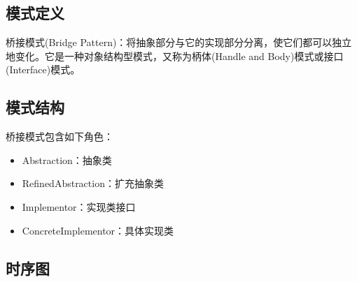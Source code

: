 \documentclass[letterpaper,10pt,english]{sphinxmanual}
\begin{document}
\subsection{模式定义}
\label{\detokenize{structural_patterns/bridge:id4}}
\sphinxAtStartPar
桥接模式(Bridge Pattern)：将抽象部分与它的实现部分分离，使它们都可以独立地变化。它是一种对象结构型模式，又称为柄体(Handle and Body)模式或接口(Interface)模式。


\subsection{模式结构}
\label{\detokenize{structural_patterns/bridge:id5}}
\sphinxAtStartPar
桥接模式包含如下角色：
\begin{itemize}
\item {} 
\sphinxAtStartPar
Abstraction：抽象类

\item {} 
\sphinxAtStartPar
RefinedAbstraction：扩充抽象类

\item {} 
\sphinxAtStartPar
Implementor：实现类接口

\item {} 
\sphinxAtStartPar
ConcreteImplementor：具体实现类

\end{itemize}

\noindent{}


\subsection{时序图}
\label{\detokenize{structural_patterns/bridge:id6}}
\noindent{}
\end{document}
